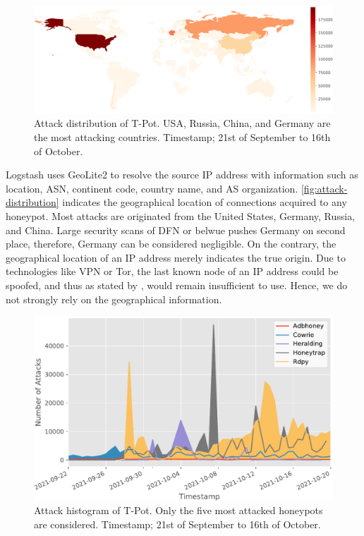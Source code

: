 \begin{figure}[ht]
    \centering
    \includegraphics[width=\textwidth]{figures/tpot-overview-map.pdf}
    \caption[Attack distribution of T-Pot]{Attack distribution of T-Pot. USA, Russia, China, and Germany are the most attacking countries. Timestamp; 21st of September to 16th of October.}
    \label{fig:attack-distribution}
\end{figure}

Logstash uses GeoLite2 to resolve the source IP address with information such as location, ASN, continent code, country name, and AS organization.
\autoref{fig:attack-distribution} indicates the geographical location of connections acquired to any honeypot.
Most attacks are originated from the United States, Germany, Russia, and China.
Large security scans of DFN or \ac{belwue} pushes Germany on second place, therefore, Germany can be considered negligible.
On the contrary, the geographical location of an IP address merely indicates the true origin.
Due to technologies like VPN or Tor, the last known node of an IP address could be spoofed, and thus as stated by \citet{Kelly2021}, would remain insufficient to use.
Hence, we do not strongly rely on the geographical information.

\begin{figure}[ht]
    \centering
    \includegraphics[width=\textwidth]{figures/tpot-attacks-histogram.pdf}
    \caption[Attack histogram of T-Pot]{Attack histogram of T-Pot. Only the five most attacked honeypots are considered. Timestamp; 21st of September to 16th of October.}
    \label{tpot-overview-histogram}
\end{figure}

